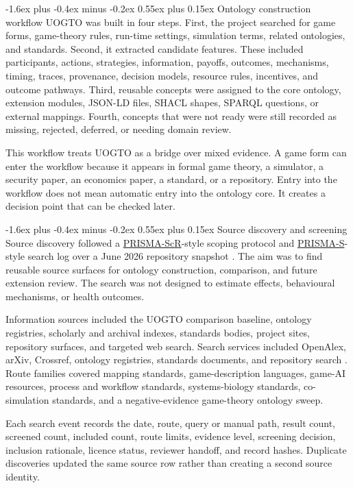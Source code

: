 \documentclass[11pt]{article}
\makeatletter
\renewcommand\subsection{\@startsection{subsection}{2}{\z@}%
  {-1.6ex plus -0.4ex minus -0.2ex}%
  {0.55ex plus 0.15ex}%
  {\normalfont\large\bfseries\color{uogtoInk}}}
\newcommand{\abblink}[2]{\hyperlink{abbr:#1}{#2}}
\makeatother
\begin{document}
\subsection{Ontology construction workflow}
UOGTO was built in four steps. First, the project searched for game forms, game-theory rules, run-time settings, simulation terms, related ontologies, and standards. Second, it extracted candidate features. These included participants, actions, strategies, information, payoffs, outcomes, mechanisms, timing, traces, provenance, decision models, resource rules, incentives, and outcome pathways. Third, reusable concepts were assigned to the core ontology, extension modules, JSON-LD files, SHACL shapes, SPARQL questions, or external mappings. Fourth, concepts that were not ready were still recorded as missing, rejected, deferred, or needing domain review.

This workflow treats UOGTO as a bridge over mixed evidence. A game form can enter the workflow because it appears in formal game theory, a simulator, a security paper, an economics paper, a standard, or a repository. Entry into the workflow does not mean automatic entry into the ontology core. It creates a decision point that can be checked later.

\subsection{Source discovery and screening}
Source discovery followed a \abblink{prismascr}{PRISMA-ScR}-style scoping protocol and \abblink{prismas}{PRISMA-S}-style search log over a June 2026 repository snapshot \cite{prisma-scr-2018,prisma-s-2021}. The aim was to find reusable source surfaces for ontology construction, comparison, and future extension review. The search was not designed to estimate effects, behavioural mechanisms, or health outcomes.

Information sources included the UOGTO comparison baseline, ontology registries, scholarly and archival indexes, standards bodies, project sites, repository surfaces, and targeted web search. Search services included OpenAlex, arXiv, Crossref, ontology registries, standards documents, and repository search \cite{openalex,arxiv-api,crossref}. Route families covered mapping standards, game-description languages, game-AI resources, process and workflow standards, systems-biology standards, co-simulation standards, and a negative-evidence game-theory ontology sweep.

Each search event records the date, route, query or manual path, result count, screened count, included count, route limits, evidence level, screening decision, inclusion rationale, licence status, reviewer handoff, and record hashes. Duplicate discoveries updated the same source row rather than creating a second source identity.
\end{document}
